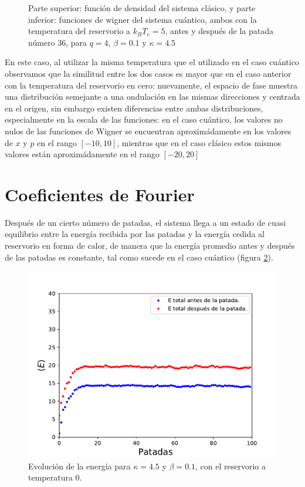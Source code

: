 \documentclass[letterpaper,12pt,oneside]{book}
\begin{document}
\begin{figure}[h!]
\begin{minipage}{0.34\textwidth}
		
	\end{minipage}
	
	
	\caption{Parte superior: función de densidad del sistema clásico, y parte inferior: funciones de wigner del sistema cuántico, ambos con la temperatura del reservorio a $k_BT_e = 5$, antes y después de la patada número 36, para $q=4$, $\beta = 0.1$ y  $\kappa=4.5$}
	\label{fig:ClasicoCuanticoPS2}
	
	
\end{figure}

En este caso, al utilizar la misma temperatura que el utilizado en el caso cuántico observamos que la similitud entre los dos casos es mayor que en el caso anterior con la temperatura del reservorio en cero: nuevamente, el espacio de fase muestra una distribución semejante a una ondulación en las mismas direcciones y centrada en el origen, sin embargo existen diferencias entre ambas distribuciones, especialmente en la escala de las funciones: en el caso cuántico, los valores no nulos de las funciones de Wigner se encuentran aproximádamente en los valores de $x$ y $p$ en el rango $[-10,10]$, mientras que en el caso clásico estos mismos valores están aproximádamente en el rango $[-20,20]$

\section{Coeficientes de Fourier}


Después de un cierto número de patadas, el sistema llega a un estado de cuasi equilibrio entre la energía recibida por las patadas y la energía cedida al reservorio en forma de calor, de manera que la energía promedio antes y después de las patadas es constante, tal como sucede en el caso cuántico (figura \ref{fig:EnergiaNormal}).

\begin{figure}[h!]
	\centering
	\includegraphics[width=12cm]{Figs/EvolucionEnergiak45}
	\caption{Evolución de la energía para $\kappa=4.5$ y $\beta=0.1$, con el reservorio a temperatura 0.}
	\label{fig:EnergiaNormal}
\end{figure}
\end{document}
